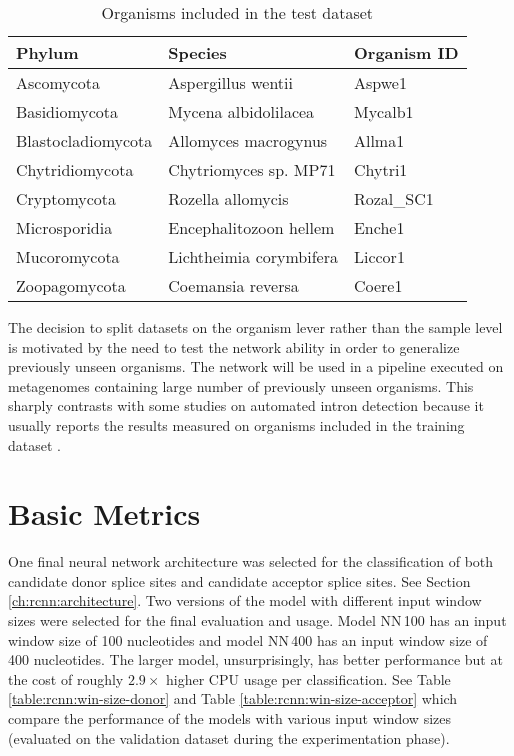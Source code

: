 \begin{table}
  \begin{center}
    \begin{tabular}{ | l | l | l | }
      \hline
      \textbf{Phylum} & \textbf{Species} & \textbf{Organism ID} \\
      \hline
      Ascomycota & Aspergillus wentii & Aspwe1 \\
      Basidiomycota & Mycena albidolilacea & Mycalb1  \\
      Blastocladiomycota & Allomyces macrogynus & Allma1 \\
      Chytridiomycota & Chytriomyces sp. MP71 & Chytri1 \\
      Cryptomycota & Rozella allomycis & Rozal\_SC1 \\
      Microsporidia & Encephalitozoon hellem & Enche1 \\
      Mucoromycota & Lichtheimia corymbifera & Liccor1 \\
      Zoopagomycota & Coemansia reversa & Coere1 \\
      \hline
    \end{tabular}
  \end{center}
  \caption{\label{table:evaluation:test-set}Organisms included in the test dataset}
\end{table}

The decision to split datasets on the organism lever rather than the sample
level is motivated by the need to test the network ability in order to
generalize previously unseen organisms. The network will be used in a pipeline
executed on metagenomes containing large number of previously unseen organisms.
This sharply contrasts with some studies on automated intron detection because
it usually reports the results measured on organisms included in the training
dataset \cite{zuallaert2018splicerover}.

\section{\label{ch:evaluation:basic}Basic Metrics}

One final neural network architecture was selected for the classification of
both candidate donor splice sites and candidate acceptor splice sites. See
Section \ref{ch:rcnn:architecture}. Two versions of the model with different
input window sizes were selected for the final evaluation and usage. Model
NN\,100 has an input window size of 100 nucleotides and model NN\,400 has an
input window size of 400 nucleotides. The larger model, unsurprisingly, has
better performance but at the cost of roughly $2.9\times$ higher CPU usage per
classification. See Table \ref{table:rcnn:win-size-donor} and Table
\ref{table:rcnn:win-size-acceptor} which compare the performance of the models
with various input window sizes (evaluated on the validation dataset during the
experimentation phase).

